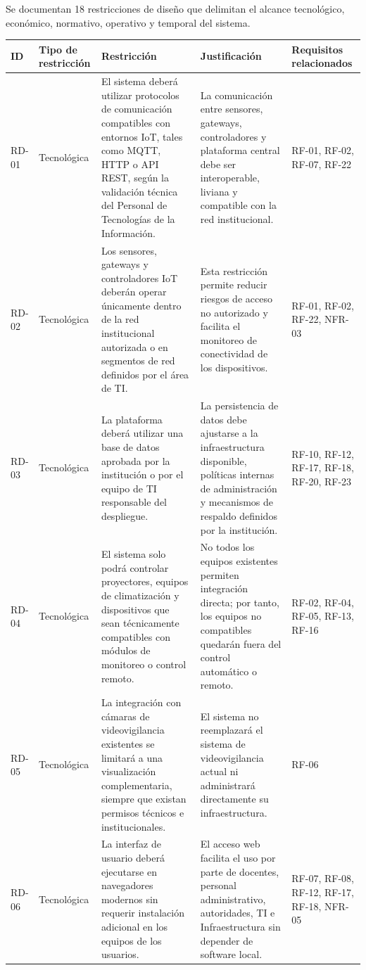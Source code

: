 
Se documentan 18 restricciones de diseño que delimitan el alcance tecnológico, económico, normativo, operativo y temporal del sistema.


\begingroup
\small
\begin{longtable}{|p{3.1cm}|p{3.1cm}|p{3.1cm}|p{3.1cm}|p{3.1cm}|}
\hline
ID & Tipo de restricción & Restricción & Justificación & Requisitos relacionados \\ \hline
RD-01 & Tecnológica & El sistema deberá utilizar protocolos de comunicación compatibles con entornos IoT, tales como MQTT, HTTP o API REST, según la validación técnica del Personal de Tecnologías de la Información. & La comunicación entre sensores, gateways, controladores y plataforma central debe ser interoperable, liviana y compatible con la red institucional. & RF-01, RF-02, RF-07, RF-22 \\ \hline
RD-02 & Tecnológica & Los sensores, gateways y controladores IoT deberán operar únicamente dentro de la red institucional autorizada o en segmentos de red definidos por el área de TI. & Esta restricción permite reducir riesgos de acceso no autorizado y facilita el monitoreo de conectividad de los dispositivos. & RF-01, RF-02, RF-22, NFR-03 \\ \hline
RD-03 & Tecnológica & La plataforma deberá utilizar una base de datos aprobada por la institución o por el equipo de TI responsable del despliegue. & La persistencia de datos debe ajustarse a la infraestructura disponible, políticas internas de administración y mecanismos de respaldo definidos por la institución. & RF-10, RF-12, RF-17, RF-18, RF-20, RF-23 \\ \hline
RD-04 & Tecnológica & El sistema solo podrá controlar proyectores, equipos de climatización y dispositivos que sean técnicamente compatibles con módulos de monitoreo o control remoto. & No todos los equipos existentes permiten integración directa; por tanto, los equipos no compatibles quedarán fuera del control automático o remoto. & RF-02, RF-04, RF-05, RF-13, RF-16 \\ \hline
RD-05 & Tecnológica & La integración con cámaras de videovigilancia existentes se limitará a una visualización complementaria, siempre que existan permisos técnicos e institucionales. & El sistema no reemplazará el sistema de videovigilancia actual ni administrará directamente su infraestructura. & RF-06 \\ \hline
RD-06 & Tecnológica & La interfaz de usuario deberá ejecutarse en navegadores modernos sin requerir instalación adicional en los equipos de los usuarios. & El acceso web facilita el uso por parte de docentes, personal administrativo, autoridades, TI e Infraestructura sin depender de software local. & RF-07, RF-08, RF-12, RF-17, RF-18, NFR-05 \\ \hline

\end{longtable}
